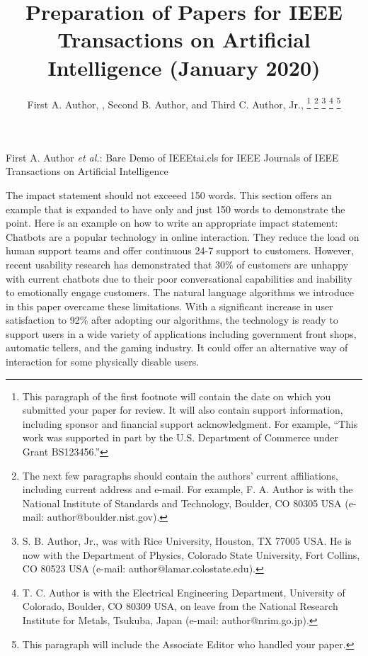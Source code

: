 \documentclass[journal]{IEEEtai}
\begin{document}
\title{Preparation of Papers for IEEE {\sc Transactions on Artificial Intelligence} (January 2020)} 


\author{First A. Author, , Second B. Author, and Third C. Author, Jr., 
\thanks{This paragraph of the first footnote will contain the date on which you submitted your paper for review. It will also contain support information, including sponsor and financial support acknowledgment. For example, ``This work was supported in part by the U.S. Department of Commerce under Grant BS123456.'' }
\thanks{The next few paragraphs should contain the authors' current affiliations, including current address and e-mail. For example, F. A. Author is with the National Institute of Standards and Technology, Boulder, CO 80305 USA (e-mail: author@boulder.nist.gov).}
\thanks{S. B. Author, Jr., was with Rice University, Houston, TX 77005 USA. He is now with the Department of Physics, Colorado State University, Fort Collins, CO 80523 USA (e-mail: author@lamar.colostate.edu).}
\thanks{T. C. Author is with the Electrical Engineering Department, University of Colorado, Boulder, CO 80309 USA, on leave from the National Research Institute for Metals, Tsukuba, Japan (e-mail: author@nrim.go.jp).}
\thanks{This paragraph will include the Associate Editor who handled your paper.}}

{First A. Author \MakeLowercase{\textit{et al.}}: Bare Demo of IEEEtai.cls for IEEE Journals of IEEE Transactions on Artificial Intelligence}

\maketitle

\begin{abstract}

\end{abstract}

\begin{IEEEImpStatement}
The impact statement should not exceeed 150 words. This section offers an example that is expanded to have only and just 150 words to demonstrate the point. Here is an example on how to write an appropriate impact statement: Chatbots are a popular technology in online interaction. They reduce the load on human support teams and offer continuous 24-7 support to customers. However, recent usability research has demonstrated that 30\% of customers are unhappy with current chatbots due to their poor conversational capabilities and inability to emotionally engage customers. The natural language algorithms we introduce in this paper overcame these limitations. With a significant increase in user satisfaction to 92\% after adopting our algorithms, the technology is ready to support users in a wide variety of applications including government front shops, automatic tellers, and the gaming industry. It could offer an alternative way of interaction for some physically disable users.
\end{IEEEImpStatement}
\end{document}
